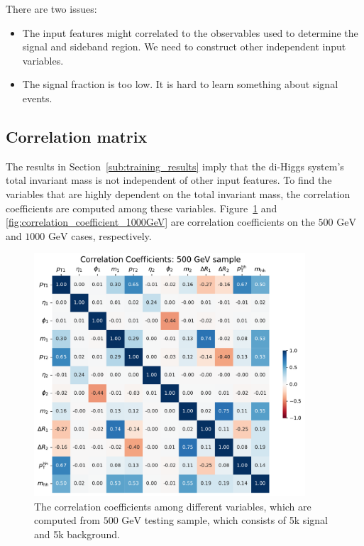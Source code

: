 \documentclass[12pt]{article}
\begin{document}
		There are two issues:
		\begin{itemize}
			\item The input features might correlated to the observables used to determine the signal and sideband region. We need to construct other independent input variables.
			\item The signal fraction is too low. It is hard to learn something about signal events. 
		\end{itemize}
	\subsection{Correlation matrix}%
	\label{sub:correlation_matrix}
		The results in Section~\ref{sub:training_results} imply that the di-Higgs system's total invariant mass is not independent of other input features. To find the variables that are highly dependent on the total invariant mass, the correlation coefficients are computed among these variables. Figure~\ref{fig:correlation_coefficient_500GeV} and \ref{fig:correlation_coefficient_1000GeV} are correlation coefficients on the $\text{500 GeV}$ and $\text{1000 GeV}$ cases, respectively. 

		\begin{figure}[htpb]
			\centering
			\includegraphics[width=0.9\textwidth]{correlation_coefficients-500GeV.pdf}
			\caption{The correlation coefficients among different variables, which are computed from $\text{500 GeV}$ testing sample, which consists of 5k signal and 5k background.}
			\label{fig:correlation_coefficient_500GeV}
		\end{figure}
		
\end{document}
